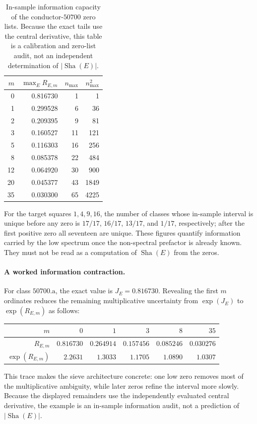 \documentclass[11pt,reqno]{amsart}
\theoremstyle{remark}
\newcommand{\ShaE}{\mathop{\mathrm{Sha}}}
\begin{document}
\begin{table}[H]
\centering
\small
\caption{In-sample information capacity of the conductor-$50700$ zero lists.  Because the exact tails use the central derivative, this table is a calibration and zero-list audit, not an independent determination of $|\ShaE(E)|$.}
\label{tab:sieve-capacity}
\begin{tabular}{@{}rrrr@{}}
\toprule
$m$ & $\max_E R_{E,m}$ & $n_{\max}$ & $n_{\max}^2$\\
\midrule
0  & 0.816730 & 1  & 1\\
1  & 0.299528 & 6  & 36\\
2  & 0.209395 & 9  & 81\\
3  & 0.160527 & 11 & 121\\
5  & 0.116303 & 16 & 256\\
8  & 0.085378 & 22 & 484\\
12 & 0.064920 & 30 & 900\\
20 & 0.045377 & 43 & 1849\\
35 & 0.030300 & 65 & 4225\\
\bottomrule
\end{tabular}
\end{table}

For the target squares $1,4,9,16$, the number of classes whose in-sample interval is unique before any zero is $17/17$, $16/17$, $13/17$, and $1/17$, respectively; after the first positive zero all seventeen are unique.  These figures quantify information carried by the low spectrum once the non-spectral prefactor is already known.  They must not be read as a computation of $\ShaE(E)$ from the zeros.

\paragraph{A worked information contraction.}
For class $50700.\mathrm a$, the exact value is $J_E=0.816730$.  Revealing the first $m$ ordinates reduces the remaining multiplicative uncertainty from $\exp(J_E)$ to $\exp(R_{E,m})$ as follows:
\begin{center}
\small
\begin{tabular}{@{}rrrrrr@{}}
\toprule
$m$ & $0$ & $1$ & $3$ & $8$ & $35$\\
\midrule
$R_{E,m}$ & $0.816730$ & $0.264914$ & $0.157456$ & $0.085246$ & $0.030276$\\
$\exp(R_{E,m})$ & $2.2631$ & $1.3033$ & $1.1705$ & $1.0890$ & $1.0307$\\
\bottomrule
\end{tabular}
\end{center}
This trace makes the sieve architecture concrete: one low zero removes most of the multiplicative ambiguity, while later zeros refine the interval more slowly.  Because the displayed remainders use the independently evaluated central derivative, the example is an in-sample information audit, not a prediction of $|\ShaE(E)|$.
\end{document}
